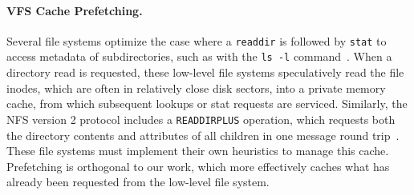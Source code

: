 



\paragraph{VFS Cache Prefetching.}
Several file systems optimize the case where a 
{\tt readdir} is followed by {\tt stat} to access metadata of subdirectories,
such as with the {\tt ls -l} command~\citep{lensing13dlfs,grid07thain,bisson12}.
When a directory read is requested, these low-level file systems speculatively 
read the file inodes, which are often in relatively close disk sectors,
into a private memory cache, from which subsequent lookups or stat requests are serviced.
Similarly, the NFS version 2 protocol includes a {\tt READDIRPLUS} operation,
which requests both the directory contents and attributes of all children
in one message round trip~\citep{rfc1813}.
These file systems must implement their own heuristics to manage this cache.
Prefetching is orthogonal to our work,
which more effectively caches what has already been requested from the low-level file system.

